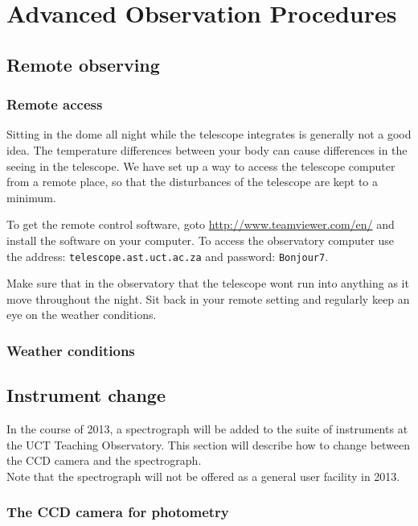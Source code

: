 \documentclass[12pt,twoside,a4paper]{report}
\begin{document}
\chapter{Advanced Observation Procedures}

\section{Remote observing}

\subsection{Remote access}

Sitting in the dome all night while the telescope integrates is generally not a good idea. 
The temperature differences between your body can cause differences in the seeing in the telescope. 
We have set up a way to access the telescope computer from a remote place, so that the disturbances 
of the telescope are kept to a minimum.

To get the remote control software, goto \url{http://www.teamviewer.com/en/} and install 
the software on your computer. To access the observatory computer use the address: 
{\tt telescope.ast.uct.ac.za} and password: {\tt Bonjour7}.

Make sure that in the observatory that the telescope wont run into anything 
as it move throughout the night. Sit back in your remote setting and regularly keep an eye 
on the weather conditions. 

\subsection{Weather conditions}

\section{Instrument change}

In the course of 2013, a spectrograph will be added to the suite of instruments
at the UCT Teaching Observatory. This section will describe how to change between
the CCD camera and the spectrograph.\\

Note that the spectrograph will not be offered as a general user facility in
2013.

\subsection{The CCD camera for photometry}
\end{document}
